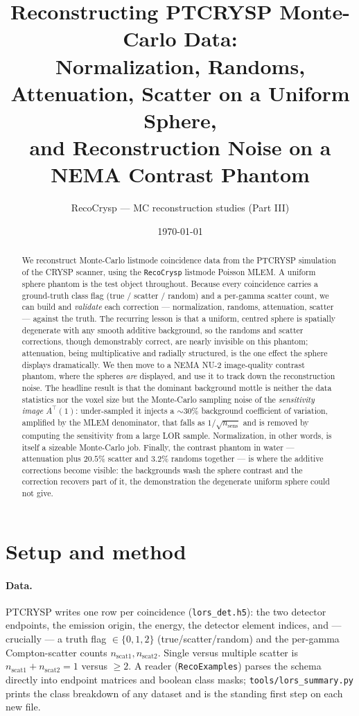 \documentclass[11pt]{article}
\title{Reconstructing PTCRYSP Monte-Carlo Data:\\
       Normalization, Randoms, Attenuation, Scatter on a Uniform Sphere,\\
       and Reconstruction Noise on a NEMA Contrast Phantom}
\author{RecoCrysp --- MC reconstruction studies (Part III)}
\date{\today}
\newcommand{\code}[1]{\texttt{#1}}
\begin{document}
\maketitle

\begin{abstract}
We reconstruct Monte-Carlo listmode coincidence data from the PTCRYSP simulation
of the CRYSP scanner, using the \code{RecoCrysp} listmode Poisson MLEM. A uniform
sphere phantom is the test object throughout. Because every coincidence carries a
ground-truth class flag (true / scatter / random) and a per-gamma scatter count,
we can build and \emph{validate} each correction --- normalization, randoms,
attenuation, scatter --- against the truth. The recurring lesson is that a uniform,
centred sphere is spatially degenerate with any smooth additive background, so the
randoms and scatter corrections, though demonstrably correct, are nearly invisible
on this phantom; attenuation, being multiplicative and radially structured, is the
one effect the sphere displays dramatically. We then move to a NEMA NU-2
image-quality contrast phantom, where the spheres \emph{are} displayed, and use it
to track down the reconstruction noise. The headline result is that the dominant
background mottle is neither the data statistics nor the voxel size but the
Monte-Carlo sampling noise of the \emph{sensitivity image} $A^{\!\top}(1)$:
under-sampled it injects a $\sim\!30\%$ background coefficient of variation,
amplified by the MLEM denominator, that falls as $1/\sqrt{n_{\text{sens}}}$ and is
removed by computing the sensitivity from a large LOR sample. Normalization, in
other words, is itself a sizeable Monte-Carlo job. Finally, the contrast phantom in
water --- attenuation plus $20.5\%$ scatter and $3.2\%$ randoms together --- is where
the additive corrections become visible: the backgrounds wash the sphere contrast and
the correction recovers part of it, the demonstration the degenerate uniform sphere
could not give.
\end{abstract}

\section{Setup and method}

\paragraph{Data.} PTCRYSP writes one row per coincidence (\code{lors\_det.h5}):
the two detector endpoints, the emission origin, the energy, the detector element
indices, and --- crucially --- a truth flag $\in\{0,1,2\}$ (true/scatter/random)
and the per-gamma Compton-scatter counts $n_{\text{scat}1},n_{\text{scat}2}$. Single
versus multiple scatter is $n_{\text{scat}1}+n_{\text{scat}2}=1$ versus $\ge 2$. A
reader (\code{RecoExamples}) parses the schema directly into endpoint matrices and
boolean class masks; \code{tools/lors\_summary.py} prints the class breakdown of any
dataset and is the standing first step on each new file.
\end{document}
